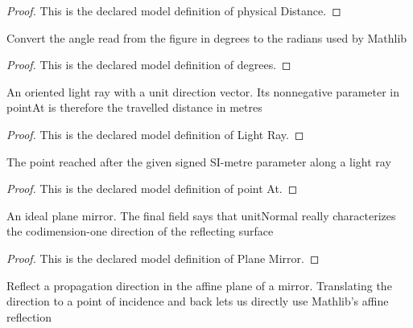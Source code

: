 \begin{proof}
  This is the declared model definition of physical Distance.
\end{proof}
\begin{definition}[degrees]
  \label{def:physics:phyx-mini-0002:phyxminiproblems-problem0002-degrees}
  Convert the angle read from the figure in degrees to the radians used by Mathlib
\end{definition}
\begin{proof}
  This is the declared model definition of degrees.
\end{proof}
\begin{definition}
  \label{def:physics:phyx-mini-0002:phyxminiproblems-problem0002-lightray}
  An oriented light ray with a unit direction vector. Its nonnegative parameter in pointAt is therefore the travelled distance in metres
\end{definition}
\begin{proof}
  This is the declared model definition of Light Ray.
\end{proof}
\begin{definition}[point At]
  \label{def:physics:phyx-mini-0002:phyxminiproblems-problem0002-lightray-pointat}
  The point reached after the given signed SI-metre parameter along a light ray
\end{definition}
\begin{proof}
  This is the declared model definition of point At.
\end{proof}
\begin{definition}
  \label{def:physics:phyx-mini-0002:phyxminiproblems-problem0002-planemirror}
  An ideal plane mirror. The final field says that unitNormal really characterizes the codimension-one direction of the reflecting surface
\end{definition}
\begin{proof}
  This is the declared model definition of Plane Mirror.
\end{proof}
\begin{definition}
  \label{def:physics:phyx-mini-0002:phyxminiproblems-problem0002-planemirror-reflectdirection}
  Reflect a propagation direction in the affine plane of a mirror. Translating the direction to a point of incidence and back lets us directly use Mathlib's affine reflection
\end{definition}
